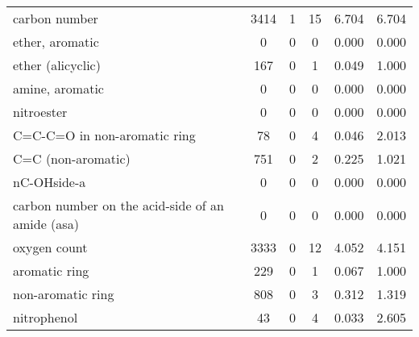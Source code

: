 \begin{tabular}{l|c|c|c|c|c|}
carbon number & 3414 & 1 & 15 & 6.704 & 6.704 \\
ether, aromatic & 0 & 0 & 0 & 0.000 & 0.000 \\
ether (alicyclic) & 167 & 0 & 1 & 0.049 & 1.000 \\
amine, aromatic & 0 & 0 & 0 & 0.000 & 0.000 \\
nitroester & 0 & 0 & 0 & 0.000 & 0.000 \\
C=C-C=O in non-aromatic ring & 78 & 0 & 4 & 0.046 & 2.013 \\
C=C (non-aromatic) & 751 & 0 & 2 & 0.225 & 1.021 \\
nC-OHside-a & 0 & 0 & 0 & 0.000 & 0.000 \\
carbon number on the acid-side of an amide (asa) & 0 & 0 & 0 & 0.000 & 0.000 \\
oxygen count & 3333 & 0 & 12 & 4.052 & 4.151 \\
aromatic ring & 229 & 0 & 1 & 0.067 & 1.000 \\
non-aromatic ring & 808 & 0 & 3 & 0.312 & 1.319 \\
nitrophenol & 43 & 0 & 4 & 0.033 & 2.605 \\
\bottomrule
\end{tabular}
